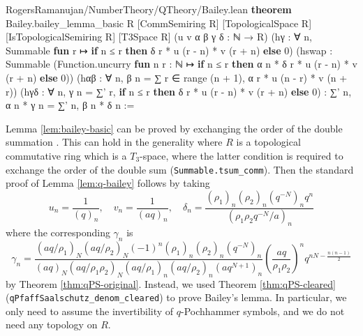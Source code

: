 \documentclass[12pt]{amsart}
\theoremstyle{definition}
\theoremstyle{remark}
\numberwithin{equation}{subsection}
\newcommand{\kw}[1]{\textcolor{keywordcolor}{\textbf{#1}}}
\newcommand{\var}[1]{\textcolor{tacticcolor}{#1}}
\newcommand{\num}[1]{\textcolor{numcolor}{#1}}
\newcommand{\imp}[1]{\textcolor{commentcolor}{\textbraceleft#1\textbraceright}}
\begin{document}
\begin{code}{RogersRamanujan/NumberTheory/QTheory/Bailey.lean}
\kw{theorem} Bailey.bailey_lemma_basic \imp{R} [CommSemiring \var{R}] [TopologicalSpace \var{R}]
  [IsTopologicalSemiring \var{R}] [T3Space \var{R}] (\var{u} \var{v} \var{α} \var{β} \var{γ} \var{δ} : ℕ → \var{R})
  (\var{hγ} : ∀ \var{n}, Summable \kw{fun} \var{r} ↦ \kw{if} \var{n} ≤ \var{r} \kw{then} \var{δ} \var{r} * \var{u} (\var{r} - \var{n}) * \var{v} (\var{r} + \var{n}) \kw{else} \num{0})
  (\var{hswap} : Summable (Function.uncurry \kw{fun} \var{n} \var{r} : ℕ ↦
    \kw{if} \var{n} ≤ \var{r} \kw{then} \var{α} \var{n} * \var{δ} \var{r} * \var{u} (\var{r} - \var{n}) * \var{v} (\var{r} + \var{n}) \kw{else} \num{0}))
  (\var{hαβ} : ∀ \var{n}, \var{β} \var{n} = ∑ \var{r} ∈ range (\var{n} + \num{1}), \var{α} \var{r} * \var{u} (\var{n} - \var{r}) * \var{v} (\var{n} + \var{r}))
  (\var{hγδ} : ∀ \var{n}, \var{γ} \var{n} = ∑' \var{r}, \kw{if} \var{n} ≤ \var{r} \kw{then} \var{δ} \var{r} * \var{u} (\var{r} - \var{n}) * \var{v} (\var{r} + \var{n}) \kw{else} \num{0}) :
  ∑' \var{n}, \var{α} \var{n} * \var{γ} \var{n} = ∑' \var{n}, \var{β} \var{n} * \var{δ} \var{n} :=
\end{code}
Lemma \ref{lem:bailey-basic} can be proved by exchanging the order of the double summation \cite[Theorem 3.1]{Andrews1986}. This can hold in the generality where $R$ is a topological commutative ring which is a $T_3$-space, where the latter condition is required to exchange the order of the double sum (\texttt{Summable.tsum\_comm}).
Then the standard proof of Lemma \ref{lem:q-bailey} follows by taking
\begin{equation}
    u_n = \frac{1}{(q)_n}, \quad v_n = \frac{1}{(aq)_n}, \quad \delta_n = \frac{(\rho_1)_n (\rho_2)_n (q^{-N})_n q^n}{(\rho_1 \rho_2 q^{-N} / a)_n}
\end{equation}
where the corresponding $\gamma_n$ is
\begin{equation}
    \gamma_n = \frac{(aq / \rho_1)_N (aq / \rho_2)_N(-1)^n (\rho_1)_n (\rho_2)_n(q^{-N})_n}{(aq)_N (aq/\rho_1\rho_2)_N (aq/\rho_1)_n (aq/\rho_2)_n(aq^{N+1})_n} \left(\frac{aq}{\rho_1\rho_2}\right)^n q^{nN - \frac{n(n-1)}{2}}
\end{equation}
by Theorem \ref{thm:qPS-original}.
Instead, we used Theorem \ref{thm:qPS-cleared} (\texttt{qPfaffSaalschutz\_denom\_cleared}) to prove Bailey's lemma.
In particular, we only need to assume the invertibility of $q$-Pochhammer symbols, and we do not need any topology on $R$.
\end{document}
